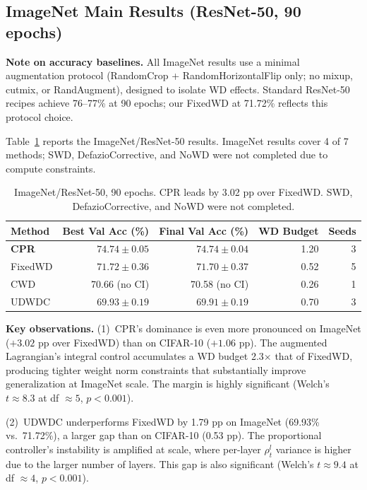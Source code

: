 \documentclass{article}
\begin{document}
\subsection{ImageNet Main Results (ResNet-50, 90 epochs)}

\textbf{Note on accuracy baselines.} All ImageNet results use a minimal augmentation protocol (RandomCrop + RandomHorizontalFlip only; no mixup, cutmix, or RandAugment), designed to isolate WD effects. Standard ResNet-50 recipes achieve 76--77\% at 90 epochs; our FixedWD at 71.72\% reflects this protocol choice.

Table~\ref{tab:imagenet} reports the ImageNet/ResNet-50 results. ImageNet results cover 4 of 7 methods; SWD, DefazioCorrective, and NoWD were not completed due to compute constraints.

\begin{table}[t]
\caption{ImageNet/ResNet-50, 90 epochs. CPR leads by 3.02 pp over FixedWD. SWD, DefazioCorrective, and NoWD were not completed.}
\label{tab:imagenet}
\centering
\begin{tabular}{lrrrr}
\toprule
Method & Best Val Acc (\%) & Final Val Acc (\%) & WD Budget & Seeds \\
\midrule
\textbf{CPR} & $\mathbf{74.74 \pm 0.05}$ & $\mathbf{74.74 \pm 0.04}$ & 1.20 & 3 \\
FixedWD & $71.72 \pm 0.36$ & $71.70 \pm 0.37$ & 0.52 & 5 \\
CWD & 70.66 (no CI) & 70.58 (no CI) & 0.26 & 1 \\
UDWDC & $69.93 \pm 0.19$ & $69.91 \pm 0.19$ & 0.70 & 3 \\
\bottomrule
\end{tabular}
\end{table}

\textbf{Key observations.} (1)~CPR's dominance is even more pronounced on ImageNet ($+3.02$ pp over FixedWD) than on CIFAR-10 ($+1.06$ pp). The augmented Lagrangian's integral control accumulates a WD budget 2.3$\times$ that of FixedWD, producing tighter weight norm constraints that substantially improve generalization at ImageNet scale. The margin is highly significant (Welch's $t \approx 8.3$ at df $\approx 5$, $p < 0.001$).

(2)~UDWDC underperforms FixedWD by 1.79 pp on ImageNet (69.93\% vs.\ 71.72\%), a larger gap than on CIFAR-10 (0.53 pp). The proportional controller's instability is amplified at scale, where per-layer $\rho_t^l$ variance is higher due to the larger number of layers. This gap is also significant (Welch's $t \approx 9.4$ at df $\approx 4$, $p < 0.001$).
\end{document}
